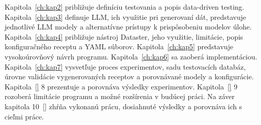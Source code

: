 Kapitola~\ref{ch:kap2} približuje definíciu testovania a popis data-driven testing. Kapitola~\ref{ch:kap3} definuje LLM, ich využitie pri generovaní dát, predstavuje jednotlivé LLM modely a alternatívne prístupy k prispôsobeniu modelov úlohe. Kapitola~\ref{ch:kap4} približuje nástroj Dataster, jeho využitie, limitácie, popis konfiguračného receptu a YAML súborov. Kapitola~\ref{ch:kap5} predstavuje vysokoúrovňový návrh programu. Kapitola~\ref{ch:kap6} sa zaoberá implementáciou. Kapitola~\ref{ch:kap7} vysvetľuje proces experimentov, sadu testovacích databáz, úrovne validácie vygenerovaných receptov a porovnávané modely a konfigurácie. Kapitola~\ref{} 8 prezentuje a porovnáva výsledky experimentov. Kapitola~\ref{} 9 rozoberá limitácie programu a možné rozšírenia v budúcej práci. Na záver kapitola 10~\ref{} zhŕňa vykonanú prácu, dosiahnuté výsledky a porovnáva ich s cieľmi práce.

